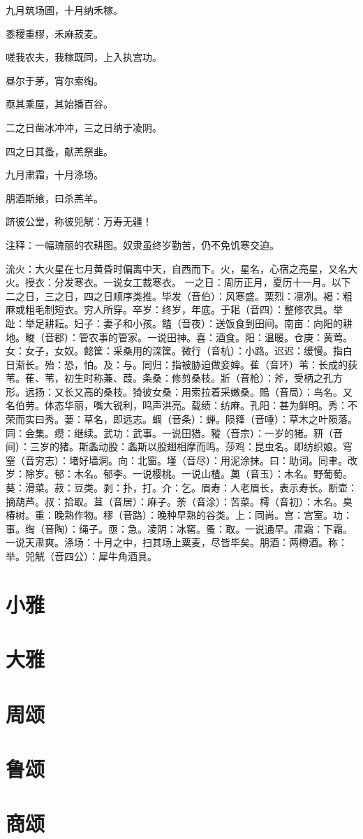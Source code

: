 \documentclass[12pt,UTF8]{ctexbook}
\begin{document}
九月筑场圃，十月纳禾稼。

黍稷重穋，禾麻菽麦。

嗟我农夫，我稼既同，上入执宫功。

昼尔于茅，宵尔索绹。

亟其乘屋，其始播百谷。

二之日凿冰冲冲，三之日纳于凌阴。

四之日其蚤，献羔祭韭。

九月肃霜，十月涤场。

朋酒斯飨，曰杀羔羊。

跻彼公堂，称彼兕觥：万寿无疆！

注释：一幅瑰丽的农耕图。奴隶虽终岁勤苦，仍不免饥寒交迫。

流火：大火星在七月黄昏时偏离中天，自西而下。火，星名，心宿之亮星，又名大火。授衣：分发寒衣。一说女工裁寒衣。 一之日：周历正月，夏历十一月。以下二之日，三之日，四之日顺序类推。毕发（音伯）：风寒盛。栗烈：凛冽。褐：粗麻或粗毛制短衣。穷人所穿。卒岁：终岁，年底。于耜（音四）：整修农具。举趾：举足耕耘。妇子：妻子和小孩。饁（音夜）：送饭食到田间。南亩：向阳的耕地。畯（音郡）：管农事的管家。一说田神。喜：酒食。阳：温暖。仓庚：黄莺。女：女子，女奴。懿筐：采桑用的深筐。微行（音杭）：小路。迟迟：缓慢。指白日渐长。殆：恐，怕。及：与。同归：指被胁迫做妾婢。萑（音环）苇：长成的荻苇。萑、苇，初生时称蒹、葭。条桑：修剪桑枝。斨（音枪）：斧，受柄之孔方形。远扬：又长又高的桑枝。猗彼女桑：用索拉着采嫩桑。鵙（音局）：鸟名。又名伯劳。体态华丽，嘴大锐利，鸣声洪亮。载绩：纺麻。孔阳：甚为鲜明。秀：不荣而实曰秀。葽：草名，即远志。蜩（音条）：蝉。陨箨（音唾）：草木之叶陨落。同：会集。缵：继续。武功：武事。一说田猎。豵（音宗）：一岁的猪。豜（音间）：三岁的猪。斯螽动股：螽斯以股翅相摩而鸣。莎鸡：昆虫名。即纺织娘。穹窒（音穷志）：堵好墙洞。向：北窗。墐（音尽）：用泥涂抹。曰：助词。同聿。改岁：除岁。郁：木名。郁李。一说樱桃。一说山楂。薁（音玉）：木名。野葡萄。葵：滑菜。菽：豆类。剥：扑，打。介：乞。眉寿：人老眉长，表示寿长。断壶：摘葫芦。叔：拾取。苴（音居）：麻子。荼（音涂）：苦菜。樗（音初）：木名。臭椿树。重：晚熟作物。穋（音路）：晚种早熟的谷类。上：同尚。宫：宫室。功：事。绹（音陶）：绳子。亟：急。凌阴：冰窖。蚤：取。一说通早。肃霜：下霜。一说天肃爽。涤场：十月之中，扫其场上粟麦，尽皆毕矣。朋酒：两樽酒。称：举。兕觥（音四公）：犀牛角酒具。

\part{小雅}

\part{大雅}

\part{周颂}

\part{鲁颂}

\part{商颂}

\backmatter
\end{document}

